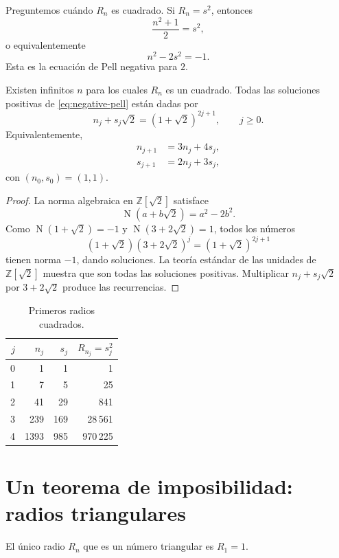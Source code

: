 \documentclass[11pt,a4paper,openany]{report}
\newcommand{\Z}{\mathbb{Z}}
\newcommand{\Norm}{\operatorname{N}}
\begin{document}
Preguntemos cuándo \(R_n\) es cuadrado. Si \(R_n=s^2\), entonces
\[
 \frac{n^2+1}{2}=s^2,
\]
o equivalentemente
\begin{equation}
 n^2-2s^2=-1.
 \label{eq:negative-pell}
\end{equation}
Esta es la ecuación de Pell negativa para \(2\).

\begin{theorem}
Existen infinitos \(n\) para los cuales \(R_n\) es un cuadrado. Todas las soluciones positivas de \eqref{eq:negative-pell} están dadas por
\[
 n_j+s_j\sqrt2=(1+\sqrt2)^{2j+1},\qquad j\ge0.
\]
Equivalentemente,
\begin{align}
 n_{j+1}&=3n_j+4s_j,\label{eq:pell-rec1}\\
 s_{j+1}&=2n_j+3s_j,\label{eq:pell-rec2}
\end{align}
con \((n_0,s_0)=(1,1)\).
\end{theorem}

\begin{proof}
La norma algebraica en \(\Z[\sqrt2]\) satisface
\[
 \Norm(a+b\sqrt2)=a^2-2b^2.
\]
Como \(\Norm(1+\sqrt2)=-1\) y \(\Norm(3+2\sqrt2)=1\), todos los números
\[
 (1+\sqrt2)(3+2\sqrt2)^j=(1+\sqrt2)^{2j+1}
\]
tienen norma \(-1\), dando soluciones. La teoría estándar de las unidades de \(\Z[\sqrt2]\) muestra que son todas las soluciones positivas. Multiplicar \(n_j+s_j\sqrt2\) por \(3+2\sqrt2\) produce las recurrencias.
\end{proof}

\begin{table}[H]
\centering
\caption{Primeros radios cuadrados.}
\begin{tabular}{rrrr}
\toprule
\(j\)&\(n_j\)&\(s_j\)&\(R_{n_j}=s_j^2\)\\
\midrule
0&1&1&1\\
1&7&5&25\\
2&41&29&841\\
3&239&169&28\,561\\
4&1393&985&970\,225\\
\bottomrule
\end{tabular}
\end{table}

\section{Un teorema de imposibilidad: radios triangulares}

\begin{theorem}
El único radio \(R_n\) que es un número triangular es \(R_1=1\).
\end{theorem}
\end{document}
